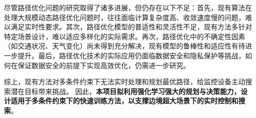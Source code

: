 尽管路径优化问题的研究取得了诸多进展，但仍存在以下不足：首先，现有算法在处理大规模动态路径优化问题时，往往面临计算复杂度高、收敛速度慢的问题，难以满足实时性要求。其次，路径优化模型的普适性和灵活性不足，现有方法多针对特定场景设计，难以适应多样化的实际需求。再次，路径优化中的不确定性因素（如交通状况、天气变化）尚未得到充分解决，现有模型的鲁棒性和适应性有待进一步提升。最后，路径优化技术的实际应用仍面临数据安全和隐私保护等挑战，如何在保证数据安全的前提下实现高效优化，仍需进一步研究。

综上，现有方法对多条件约束下无法实时处理和规划最优路径，给监控设备主动搜索潜在目标带来挑战。
因此，\textbf{本项目拟利用强化学习强大的规划与决策能力，设计适用于多条件约束下的快速训练方法，以支撑边境超大场景下的实时控制和搜索}。
